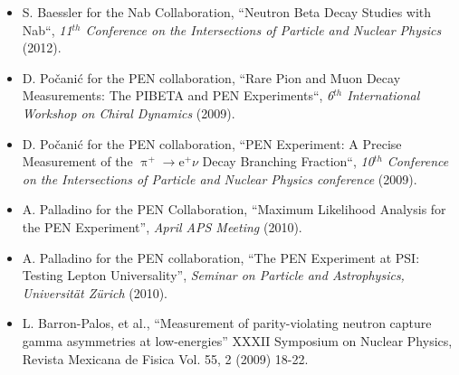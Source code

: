 \documentclass[10pt]{article}
\begin{document}
\begin{itemize}
\item S. Baessler for the Nab Collaboration, ``Neutron Beta Decay Studies with Nab``, \emph{11$^{th}$ Conference on the Intersections of Particle and Nuclear Physics } (2012).
\item D. Po\v{c}ani\'c for the PEN collaboration, ``Rare Pion and Muon Decay Measurements: The PIBETA and PEN Experiments``, \emph{6$^{th}$ International Workshop on Chiral Dynamics} (2009).
\item D. Po\v{c}ani\'c for the PEN collaboration, ``PEN Experiment: A Precise Measurement of the $\uppi^{+}\rightarrow\mathrm{e}^{+}\nu$ Decay Branching Fraction``, \emph{10$^{th}$ Conference on the Intersections of Particle and Nuclear Physics conference} (2009).
\item A. Palladino for the PEN Collaboration, ``Maximum Likelihood Analysis for the PEN Experiment'', \emph{April APS Meeting} (2010).
\item A. Palladino for the PEN collaboration, ``The PEN Experiment at PSI: Testing Lepton Universality'', \emph{Seminar on Particle and Astrophysics, Universit\"at Z\"urich} (2010).
\item L. Barron-Palos, et al., ``Measurement of parity-violating neutron capture gamma asymmetries at low-energies'' XXXII Symposium on Nuclear Physics, Revista Mexicana de Fisica Vol. 55, 2 (2009) 18-22.


\end{itemize}
\end{document}
